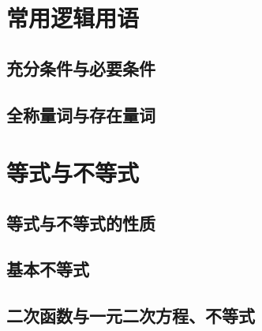\documentclass[../main.tex]{subfiles}
\begin{document}
\section{常用逻辑用语}

\subsection{充分条件与必要条件}

\subsection{全称量词与存在量词}

\section{等式与不等式}

\subsection{等式与不等式的性质}

\subsection{基本不等式}

\subsection{二次函数与一元二次方程、不等式}
\end{document}
